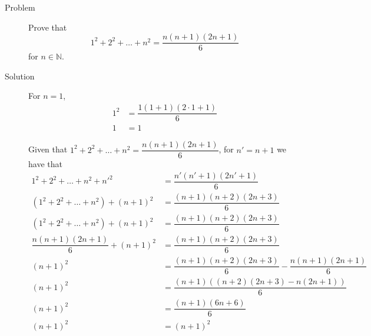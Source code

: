 \begin{description}
\item[Problem] Prove that
$$1^2 + 2^2 + \ldots + n^2 = \dfrac{n(n+1)(2n+1)}{6}$$
for $n \in \mathbb{N}$.

\item[Solution] For $n = 1$,
\begin{equation*}\begin{aligned}
1^2 &= \dfrac{1(1 + 1)(2 \cdot 1 + 1)}{6} \\
1   &= 1
\end{aligned}\end{equation*}

Given that $1^2 + 2^2 + \ldots + n^2 = \dfrac{n(n+1)(2n+1)}{6}$, for $n' = n +
1$ we have that
\begin{equation*}\begin{aligned}
1^2 + 2^2 + \ldots + n^2 + n'^2 &= \dfrac{n'(n'+1)(2n'+1)}{6} \\
(1^2 + 2^2 + \ldots + n^2) + (n+1)^2 &= \dfrac{(n+1)(n+2)(2n+3)}{6} \\
(1^2 + 2^2 + \ldots + n^2) + (n+1)^2 &= \dfrac{(n+1)(n+2)(2n+3)}{6} \\
\dfrac{n(n+1)(2n+1)}{6} + (n+1)^2 &= \dfrac{(n+1)(n+2)(2n+3)}{6} \\
(n+1)^2 &= \dfrac{(n+1)(n+2)(2n+3)}{6} - \dfrac{n(n+1)(2n+1)}{6} \\
(n+1)^2 &= \dfrac{(n+1)\left((n+2)(2n+3) - n(2n+1)\right)}{6} \\
(n+1)^2 &= \dfrac{(n+1)\left(6n + 6\right)}{6} \\
(n+1)^2 &= (n+1)^2
\end{aligned}\end{equation*}

\end{description}
